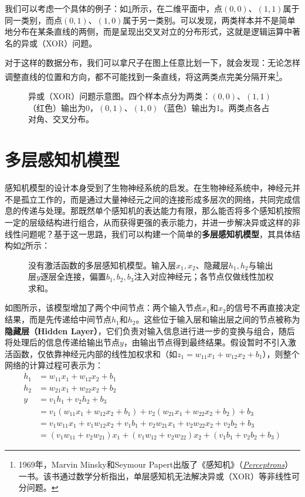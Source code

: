 我们可以考虑一个具体的例子：如\cref{fig:xor_problem}所示，在二维平面中，点$(0,0)$、$(1,1)$属于同一类别，而点$(0,1)$、$(1,0)$属于另一类别。可以发现，两类样本并不是简单地分布在某条直线的两侧，而是呈现出交叉对立的分布形式，这就是逻辑运算中著名的异或（XOR）问题。

对于这样的数据分布，我们可以拿尺子在图上任意比划一下，就会发现：无论怎样调整直线的位置和方向，都不可能找到一条直线，将这两类点完美分隔开来\footnote{1969年，Marvin Minsky和Seymour Papert出版了《感知机》（\href{https://rodsmith.nz/wp-content/uploads/Minsky-and-Papert-Perceptrons.pdf}{\textit{Perceptrons}}）一书。该书通过数学分析指出，单层感知机无法解决异或（XOR）等非线性可分问题。}。

\begin{figure}[H]
    \caption{异或（XOR）问题示意图。四个样本点分为两类：$(0,0)$、$(1,1)$（红色）输出为0，$(0,1)$、$(1,0)$（蓝色）输出为1。两类点各占对角、交叉分布。}
    \label{fig:xor_problem}
\end{figure}

\section{多层感知机模型}

感知机模型的设计本身受到了生物神经系统的启发。在生物神经系统中，神经元并不是孤立工作的，而是通过大量神经元之间的连接形成多层次的网络，共同完成信息的传递与处理。那既然单个感知机的表达能力有限，那么能否将多个感知机按照一定的层级结构进行组合，从而获得更强的表示能力，并进一步解决异或这样的非线性问题呢？基于这一思路，我们可以构建一个简单的\textbf{多层感知机模型}，其具体结构如\cref{fig:mlp_without_activation}所示：
\begin{figure}[H]
    \caption{没有激活函数的多层感知机模型。输入层$x_1,x_2$、隐藏层$h_1,h_2$与输出层$y$逐层全连接，偏置$b_1,b_2,b_3$注入对应神经元；各节点仅做线性加权求和。}
    \label{fig:mlp_without_activation}
\end{figure}

如图所示，该模型增加了两个中间节点：两个输入节点$x_1$和$x_2$的信号不再直接决定结果，而是先传递给中间节点$h_1$和$h_2$。这些位于输入层和输出层之间的节点被称为\textbf{隐藏层（Hidden Layer）}，它们负责对输入信息进行进一步的变换与组合，随后将处理后的信息传递给输出节点$y$，由输出节点得到最终结果。假设暂时不引入激活函数，仅依靠神经元内部的线性加权求和（如$z_1 = w_{11}x_1 + w_{12}x_2 + b_1$），则整个网络的计算过程可表示为：
\begin{align*}
    h_1&=w_{11}x_1+w_{12}x_2+b_1\\
    h_2&=w_{21}x_1+w_{22}x_2+b_2\\
    y&=v_1h_1+v_2h_2+b_3\\
     &= v_1 (w_{11}x_1 + w_{12}x_2 + b_1) + v_2 (w_{21}x_1 + w_{22}x_2 + b_2) + b_3 \\
     &= v_1w_{11}x_1 + v_1w_{12}x_2 + v_1b_1 + v_2w_{21}x_1 + v_2w_{22}x_2 + v_2b_2 + b_3 \\
     &= (v_1w_{11} + v_2w_{21})x_1 + (v_1w_{12} + v_2w_{22})x_2 + (v_1b_1 + v_2b_2 + b_3)
\end{align*}

